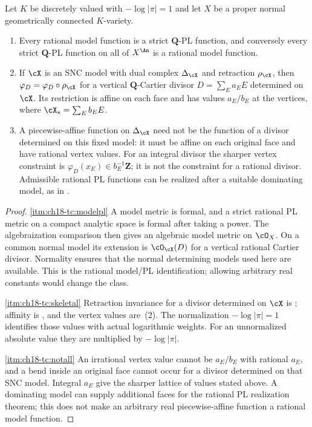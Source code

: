 \begin{proposition}
\label{prop:ch18-three-classes}
Let $K$ be discretely valued with $-\log|\pi|=1$ and let $X$ be a proper
normal geometrically connected $K$-variety.
\begin{enumerate}
\item\label{itm:ch18-tc:modelpl}
 Every rational model function is a strict $\mathbf Q$-PL function, and
 conversely every strict $\mathbf Q$-PL function on all of $X^{\An}$ is a
 rational model function.
\item\label{itm:ch18-tc:skeletal}
 If $\cX$ is an SNC model with dual complex $\Delta_\cX$ and retraction
 $\rho_\cX$, then $\varphi_D=\varphi_D\circ\rho_\cX$ for a vertical
 $\mathbf Q$-Cartier divisor $D=\sum_Ea_EE$ determined on $\cX$.
 Its restriction is affine on each face and has values $a_E/b_E$ at the
 vertices, where $\cX_s=\sum_Eb_EE$.
\item\label{itm:ch18-tc:notall}
 A piecewise-affine function on $\Delta_\cX$ need not be the function of a
 divisor determined on this fixed model: it must be affine on each original
 face and have rational vertex values.  For an integral divisor the sharper
 vertex constraint is $\varphi_D(x_E)\in b_E^{-1}\mathbf Z$; it is not
 the constraint for a rational divisor.  Admissible rational PL functions
 can be realized after a suitable dominating model, as in
 .
\end{enumerate}
\end{proposition}

\begin{proof}
\cref{itm:ch18-tc:modelpl} A model metric is formal, and a strict rational
PL metric on a compact analytic space is formal after taking a power.
The algebraization comparison  then gives
an algebraic model metric on $\cO_X$.  On a common normal model its
extension is $\cO_\cX(D)$ for a vertical rational Cartier divisor.
Normality ensures that the normal determining models used here are
available.  This is the rational model/PL identification; allowing arbitrary
real constants would change the class.

\cref{itm:ch18-tc:skeletal} Retraction invariance for a divisor determined
on $\cX$ is ; affinity is
, and the vertex values are
\,(2).  The normalization
$-\log|\pi|=1$ identifies those values with actual logarithmic weights.
For an unnormalized absolute value they are multiplied by $-\log|\pi|$.

\cref{itm:ch18-tc:notall} An irrational vertex value cannot be $a_E/b_E$
with rational $a_E$, and a bend inside an original face cannot occur for a
divisor determined on that SNC model.  Integral $a_E$ give the sharper
lattice of values stated above.  A dominating model can supply additional
faces for the rational PL realization theorem; this does not make an
arbitrary real piecewise-affine function a rational model function.
\end{proof}

